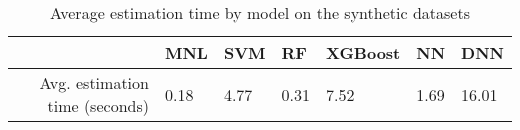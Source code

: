 \begin{table}
\centering
\caption{Average estimation time by model on the synthetic datasets}
\label{tab:experiment-1-time}
\begin{tabular}{rllllll}
\toprule
{} &   MNL &   SVM &    RF &  XGBoost &    NN &    DNN \\
\midrule
Avg. estimation time (seconds) &  0.18 &  4.77 &  0.31 &     7.52 &  1.69 &  16.01 \\
\bottomrule
\end{tabular}
\end{table}

